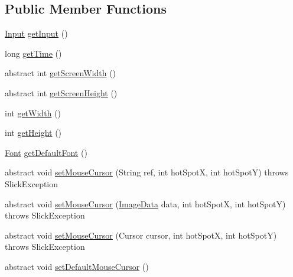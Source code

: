 \subsection*{Public Member Functions}
\begin{DoxyCompactItemize}
\item 
\mbox{\hyperlink{classorg_1_1newdawn_1_1slick_1_1_input}{Input}} \mbox{\hyperlink{interfaceorg_1_1newdawn_1_1slick_1_1gui_1_1_g_u_i_context_a716423197d42cf412e98f2650603914f}{get\+Input}} ()
\item 
long \mbox{\hyperlink{interfaceorg_1_1newdawn_1_1slick_1_1gui_1_1_g_u_i_context_a796c54a6f7d2337903afd68002dfeb0d}{get\+Time}} ()
\item 
abstract int \mbox{\hyperlink{interfaceorg_1_1newdawn_1_1slick_1_1gui_1_1_g_u_i_context_abbe4c9d529ed0c3dff177021f4839389}{get\+Screen\+Width}} ()
\item 
abstract int \mbox{\hyperlink{interfaceorg_1_1newdawn_1_1slick_1_1gui_1_1_g_u_i_context_ad7b27d047f72ef86c1ec448492a16d6a}{get\+Screen\+Height}} ()
\item 
int \mbox{\hyperlink{interfaceorg_1_1newdawn_1_1slick_1_1gui_1_1_g_u_i_context_a013e06eaddd0d6872dc628ca171c6753}{get\+Width}} ()
\item 
int \mbox{\hyperlink{interfaceorg_1_1newdawn_1_1slick_1_1gui_1_1_g_u_i_context_a6370bee8e5833f95e27724b6a533c211}{get\+Height}} ()
\item 
\mbox{\hyperlink{interfaceorg_1_1newdawn_1_1slick_1_1_font}{Font}} \mbox{\hyperlink{interfaceorg_1_1newdawn_1_1slick_1_1gui_1_1_g_u_i_context_a85b319f98e2881a0236edfe0dcdf71af}{get\+Default\+Font}} ()
\item 
abstract void \mbox{\hyperlink{interfaceorg_1_1newdawn_1_1slick_1_1gui_1_1_g_u_i_context_a47c70498d554deaf50e328ec79385a20}{set\+Mouse\+Cursor}} (String ref, int hot\+SpotX, int hot\+SpotY)  throws Slick\+Exception
\item 
abstract void \mbox{\hyperlink{interfaceorg_1_1newdawn_1_1slick_1_1gui_1_1_g_u_i_context_a06020a7f3e4688fa7aa76f9c07b3958a}{set\+Mouse\+Cursor}} (\mbox{\hyperlink{interfaceorg_1_1newdawn_1_1slick_1_1opengl_1_1_image_data}{Image\+Data}} data, int hot\+SpotX, int hot\+SpotY)  throws Slick\+Exception
\item 
abstract void \mbox{\hyperlink{interfaceorg_1_1newdawn_1_1slick_1_1gui_1_1_g_u_i_context_a659a53b877f78b793fe3e6206c7c4a0c}{set\+Mouse\+Cursor}} (Cursor cursor, int hot\+SpotX, int hot\+SpotY)  throws Slick\+Exception
\item 
abstract void \mbox{\hyperlink{interfaceorg_1_1newdawn_1_1slick_1_1gui_1_1_g_u_i_context_a665c6e15e417418eccf462a1ec957b1a}{set\+Default\+Mouse\+Cursor}} ()
\end{DoxyCompactItemize}


